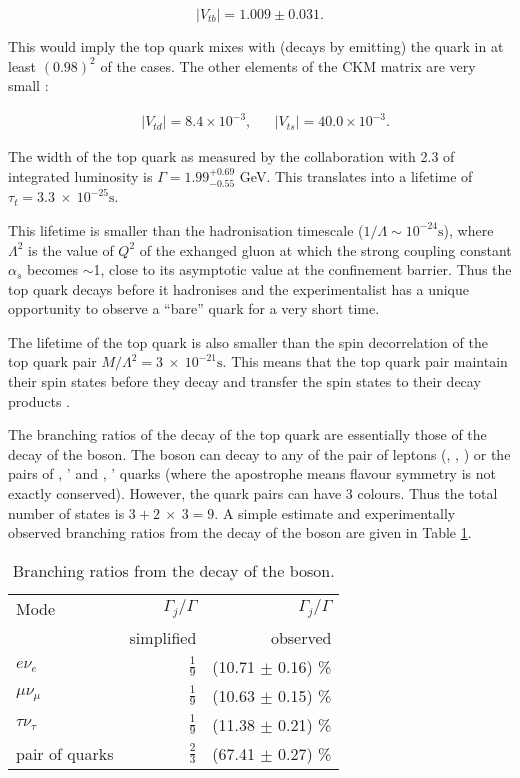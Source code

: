 \begin{equation}
  |V_{tb}|=1.009\pm0.031.
\end{equation}

This would imply the top quark mixes with (decays by emitting) the \cPqb quark in at least $(0.98)^{2}$ of the cases. The other elements of the CKM matrix are very small \cite{Patrignani:2016xqp}:

\begin{align}
  & |V_{td}|=8.4\times10^{-3}, && |V_{ts}|=40.0\times10^{-3}.
\end{align}

The width of the top quark as measured by the \DZERO collaboration \cite{Abazov:2010tm} with 2.3 \fbinv of integrated luminosity is $\Gamma=1.99^{+0.69}_{-0.55}$ GeV. This translates into a lifetime of $\tau_{t}=3.3\ \times\ 10^{-25}\text{s}$.

This lifetime is smaller than the hadronisation timescale ($1/\Lambda\sim10^{-24}\text{s}$), where $\Lambda^{2}$ is the value of $Q^{2}$ of the exhanged gluon at which the strong coupling constant $\alpha_{s}$ becomes $\sim$1, close to its asymptotic value at the confinement barrier. Thus the top quark decays before it hadronises and the experimentalist has a unique opportunity to observe a ``bare'' quark for a very short time.

The lifetime of the top quark is also smaller than the spin decorrelation of the top quark pair $M/{\Lambda^{2}}=3\ \times\ 10^{-21}\text{s}$. This means that the top quark pair maintain their spin states before they decay and transfer the spin states to their decay products \cite{Cristinziani:2016vif}.

The branching ratios of the decay of the top quark are essentially those of the decay of the \PW boson. The \PW boson can decay to any of the pair of leptons (\Pe\Pgne, \Pgm\Pgngm, \Pgt\Pgngt) or the pairs of \cPqu, \cPqd' and \cPqc, \cPqs' quarks (where the apostrophe means flavour symmetry is not exactly conserved). However, the quark pairs can have 3 colours. Thus the total number of states is $3+2\ \times\ 3=9$. A simple estimate and experimentally observed branching ratios from the decay of the \PW boson are given in Table \ref{tab:W_br}.

\begin{table}[h!]
  \centering
  \caption{Branching ratios from the decay of the \PW boson.}
  \label{tab:W_br}
  \begin{tabular}{l r r}
    Mode                  & $\Gamma_{j}/\Gamma$ & $\Gamma_{j}/\Gamma$\\
                          & simplified          & observed \cite{Patrignani:2016xqp}\\
    \hline
    $e\nu_{e}$            & $\frac{1}{9}$       & (10.71 $\pm$ 0.16) \%\\
    $\mu\nu_{\mu}$        & $\frac{1}{9}$       & (10.63 $\pm$ 0.15) \%\\
    $\tau\nu_{\tau}$      & $\frac{1}{9}$       & (11.38 $\pm$ 0.21) \%\\
    pair of quarks        & $\frac{2}{3}$       & (67.41 $\pm$ 0.27) \%
  \end{tabular}
\end{table}


